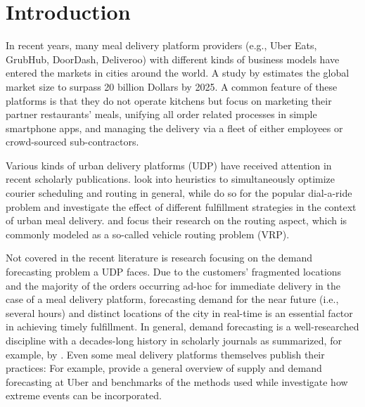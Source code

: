 \section{Introduction}
\label{intro}

In recent years, many meal delivery platform providers (e.g., Uber Eats,
    GrubHub, DoorDash, Deliveroo) with different kinds of business models have
    entered the markets in cities around the world.
A study by \cite{hirschberg2016} estimates the global market size to surpass
    20 billion Dollars by 2025.
A common feature of these platforms is that they do not operate kitchens but
    focus on marketing their partner restaurants' meals, unifying all order
    related processes in simple smartphone apps, and managing the delivery via
    a fleet of either employees or crowd-sourced sub-contractors.

Various kinds of urban delivery platforms (UDP)
    have received attention in recent scholarly publications.
\cite{hou2018} look into heuristics to simultaneously optimize courier
    scheduling and routing in general, while \cite{masmoudi2018} do so
    for the popular dial-a-ride problem and \cite{wang2018} investigate
    the effect of different fulfillment strategies in the context of urban
    meal delivery.
\cite{ehmke2018} and \cite{alcaraz2019} focus their research on the routing
    aspect, which is commonly modeled as a so-called vehicle routing problem (VRP).

Not covered in the recent literature is research focusing on the demand
    forecasting problem a UDP faces.
Due to the customers' fragmented locations and the majority of the orders
    occurring ad-hoc for immediate delivery in the case of a meal delivery
    platform, forecasting demand for the near future (i.e., several hours)
    and distinct locations of the city in real-time is an essential factor
    in achieving timely fulfillment.
In general, demand forecasting is a well-researched discipline with a
    decades-long history in scholarly journals as summarized, for example, by
    \cite{de2006}.
Even some meal delivery platforms themselves publish their practices: For
    example, \cite{bell2018} provide a general overview of supply and demand
    forecasting at Uber and benchmarks of the methods used while
    \cite{laptev2017} investigate how extreme events can be incorporated.


